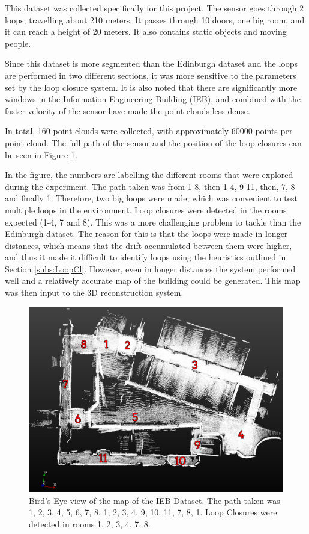 \documentclass[11pt]{article}
\begin{document}
This dataset was collected specifically for this project. The sensor goes through 2 loops, travelling about 210 meters. It passes through 10 doors, one big room, and it can reach a height of 20 meters. It also contains static objects and moving people.
	
Since this dataset is more segmented than the Edinburgh dataset and the loops are performed in two different sections, it was more sensitive to the parameters set by the loop closure system. It is also noted that there are significantly more windows in the Information Engineering Building (IEB), and combined with the faster velocity of the sensor have made the point clouds less dense. 
	
In total, 160 point clouds were collected, with approximately 60000 points per point cloud. The full path of the sensor and the position of the loop closures can be seen in Figure \ref{fig:TopViewIEBDataset}.
	
In the figure, the numbers are labelling the different rooms that were explored during the experiment. The path taken was from 1-8, then 1-4, 9-11, then, 7, 8 and finally 1. Therefore, two big loops were made, which was convenient to test multiple loops in the environment. Loop closures were detected in the rooms expected (1-4, 7 and 8). This was a more challenging problem to tackle than the Edinburgh dataset. The reason for this is that the loops were made in longer distances, which means that the drift accumulated between them were higher, and thus it made it difficult to identify loops using the heuristics outlined in Section \ref{subs:LoopCl}. However, even in longer distances the system performed well and a relatively accurate map of the building could be generated. This map was then input to the 3D reconstruction system. 
	
\begin{figure}[h]
\centering
\includegraphics[width=0.8\linewidth]{Maps2/TopViewMarked}
\caption{Bird's Eye view of the map of the IEB Dataset. The path taken was 1, 2, 3, 4, 5, 6, 7, 8, 1, 2, 3, 4, 9, 10, 11, 7, 8, 1. Loop Closures were detected in rooms 1, 2, 3, 4, 7, 8.}
\label{fig:TopViewIEBDataset}
\end{figure}
\end{document}
